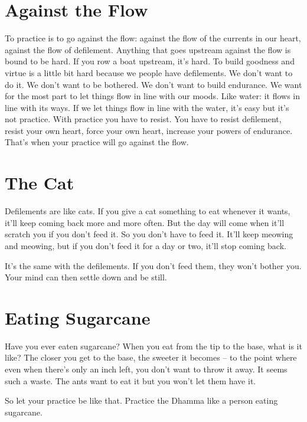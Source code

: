 \section{Against the Flow}

To practice is to go against the flow: against the flow of the currents in our heart, against the flow of defilement. Anything that goes upstream against the flow is bound to be hard. If you row a boat upstream, it's hard. To build goodness and virtue is a little bit hard because we people have defilements. We don't want to do it. We don't want to be bothered. We don't want to build endurance. We want for the most part to let things flow in line with our moods. Like water: it flows in line with its ways. If we let things flow in line with the water, it's easy but it's not practice. With practice you have to resist. You have to resist defilement, resist your own heart, force your own heart, increase your powers of endurance. That's when your practice will go against the flow.

\clearpage

\section{The Cat}

Defilements are like cats. If you give a cat something to eat whenever it wants, it'll keep coming back more and more often. But the day will come when it'll scratch you if you don't feed it. So you don't have to feed it. It'll keep meowing and meowing, but if you don't feed it for a day or two, it'll stop coming back. 

It's the same with the defilements. If you don't feed them, they won't bother you. Your mind can then settle down and be still.

\section{Eating Sugarcane}

Have you ever eaten sugarcane? When you eat from the tip to the base, what is it like? The closer you get to the base, the sweeter it becomes -- to the point where even when there's only an inch left, you don't want to throw it away. It seems such a waste. The ants want to eat it but you won't let them have it.

So let your practice be like that. Practice the Dhamma like a person eating sugarcane. 

\clearpage

